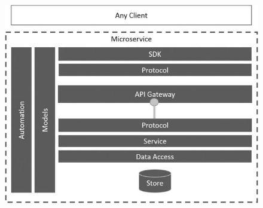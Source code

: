 \documentclass[12pt]{report} %
\begin{document}
\begin{figure}[H]
	{\includegraphics[scale=.8]{9781484212769_Fig03-04.jpg}}
\end{figure}
\end{document}
